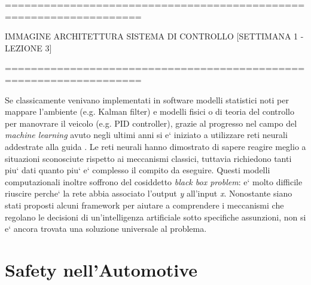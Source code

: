 ===================================================================

IMMAGINE ARCHITETTURA SISTEMA DI CONTROLLO
[SETTIMANA 1 - LEZIONE 3]

===================================================================
\newline\newline

Se classicamente venivano implementati in software modelli statistici noti per mappare l'ambiente (e.g. Kalman filter) e modelli fisici o di teoria del controllo per manovrare il veicolo (e.g. PID controller), grazie al progresso nel campo del \textsl{machine learning} avuto negli ultimi anni si e` iniziato a utilizzare reti neurali addestrate alla guida \cite{1} \cite{2}.\newline
Le reti neurali hanno dimostrato di sapere reagire meglio a situazioni sconosciute rispetto ai meccanismi classici, tuttavia richiedono tanti piu` dati quanto piu` e` complesso il compito da eseguire.\n
Questi modelli computazionali inoltre soffrono del cosiddetto \textsl{black box problem}: e` molto difficile riuscire perche` la rete abbia associato l'output \textsl{y} all'input \textsl{x}. Nonostante siano stati proposti alcuni framework \cite{3} per aiutare a comprendere i meccanismi che regolano le decisioni di un'intelligenza artificiale sotto specifiche assunzioni, non si e` ancora trovata una soluzione universale al problema.\newline


\section{Safety nell'Automotive}

